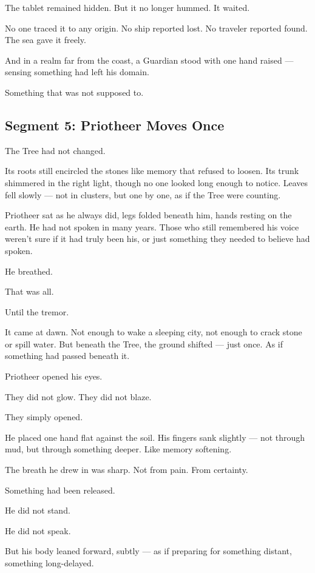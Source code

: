 \documentclass[9pt]{article}
\begin{document}
The tablet remained hidden. But it no longer hummed. It waited.

No one traced it to any origin. No ship reported lost. No traveler reported found. The sea gave it freely.

And in a realm far from the coast, a Guardian stood with one hand raised — sensing something had left his domain.

Something that was not supposed to.


\newpage

\subsection*{Segment 5: Priotheer Moves Once}

The Tree had not changed.

Its roots still encircled the stones like memory that refused to loosen. Its trunk shimmered in the right light, though no one looked long enough to notice. Leaves fell slowly — not in clusters, but one by one, as if the Tree were counting.

Priotheer sat as he always did, legs folded beneath him, hands resting on the earth. He had not spoken in many years. Those who still remembered his voice weren’t sure if it had truly been his, or just something they needed to believe had spoken.

He breathed.

That was all.

Until the tremor.

It came at dawn. Not enough to wake a sleeping city, not enough to crack stone or spill water. But beneath the Tree, the ground shifted — just once. As if something had passed beneath it.

Priotheer opened his eyes.

They did not glow. They did not blaze.

They simply opened.

He placed one hand flat against the soil. His fingers sank slightly — not through mud, but through something deeper. Like memory softening.

The breath he drew in was sharp. Not from pain. From certainty.

Something had been released.

He did not stand.

He did not speak.

But his body leaned forward, subtly — as if preparing for something distant, something long-delayed.
\end{document}
